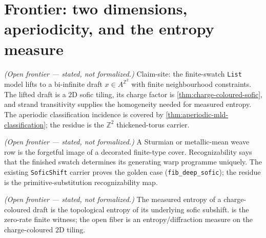 \section{Frontier: two dimensions, aperiodicity, and the entropy measure}

\begin{theorem}\label{thm:weave-2d-sofic}\notready{}
\emph{(Open frontier --- stated, not formalized.)} Claim-site: the finite-swatch
\texttt{List} model lifts to a bi-infinite draft $x\in A^{\mathbb{Z}^2}$ with finite
neighbourhood constraints.  The lifted draft is a $2$D sofic tiling, its charge
factor is \cref{thm:charge-coloured-sofic}, and strand transitivity supplies the
homogeneity needed for measured entropy.  The aperiodic classification incidence is
covered by \cref{thm:aperiodic-mld-classification}; the residue is the
$\mathbb{Z}^2$ thickened-torus carrier.
\end{theorem}

\begin{theorem}\label{thm:quasiperiodic-weave-recognizable}\notready{}
\emph{(Open frontier --- stated, not formalized.)} A Sturmian or metallic-mean weave
row is the forgetful image of a decorated finite-type cover.  Recognizability says
that the finished swatch determines its generating warp programme uniquely.  The
existing \texttt{SoficShift} carrier proves the golden case
(\texttt{fib\_deep\_sofic}); the residue is the primitive-substitution
recognizability map.
\end{theorem}

\begin{theorem}\label{thm:weave-infotiles-entropy}\notready{}
\emph{(Open frontier --- stated, not formalized.)} The measured entropy of a
charge-coloured draft is the topological entropy of its underlying sofic subshift.
 is the zero-rate finite witness; the open fiber is
an entropy/diffraction measure on the charge-coloured $2$D tiling.
\end{theorem}

